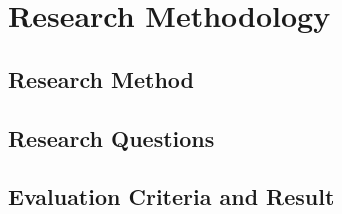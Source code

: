 

\chapter{Research Methodology}
\section{Research Method}
\section{Research Questions}
\section{Evaluation Criteria and Result}
\cleardoublepage
